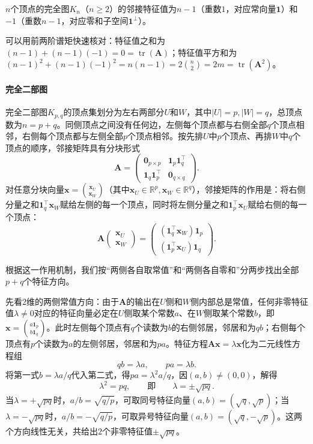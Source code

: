 \begin{theorem}[完全图的邻接谱]
\label{prop:adjacency-complete-spectrum}
$n$个顶点的完全图$K_n$（$n\geq 2$）的邻接特征值为$n-1$（重数$1$，对应常向量$\bm 1$）和$-1$（重数$n-1$，对应零和子空间$\bm 1^\perp$）。
\end{theorem}

可以用前两阶谱矩快速核对：特征值之和为$(n-1)+(n-1)(-1)=0=\operatorname{tr}(\bm A)$；特征值平方和为$(n-1)^2+(n-1)(-1)^2=n(n-1)=2\binom{n}{2}=2m=\operatorname{tr}(\bm A^2)$。

\paragraph{完全二部图}

完全二部图$K_{p,q}$的顶点集划分为左右两部分$U$和$W$，其中$|U|=p,|W|=q$，总顶点数为$n=p+q$。同侧顶点之间没有任何边，左侧每个顶点都与右侧全部$q$个顶点相邻，右侧每个顶点都与左侧全部$p$个顶点相邻。按先排$U$中$p$个顶点、再排$W$中$q$个顶点的顺序，邻接矩阵具有分块形式
\[
\bm A=
\begin{pmatrix}
\bm 0_{p\times p} & \bm 1_p\bm 1_q^\top\\
\bm 1_q\bm 1_p^\top & \bm 0_{q\times q}
\end{pmatrix}.
\]
对任意分块向量$\bm x=\binom{\bm x_U}{\bm x_W}$（其中$\bm x_U\in\mathbb R^p,\bm x_W\in\mathbb R^q$），邻接矩阵的作用是：将右侧分量之和$\bm 1_q^\top\bm x_W$赋给左侧的每一个顶点，同时将左侧分量之和$\bm 1_p^\top\bm x_U$赋给右侧的每一个顶点：
\[
\bm A\begin{pmatrix}\bm x_U\\\bm x_W\end{pmatrix}
=\begin{pmatrix}(\bm 1_q^\top\bm x_W)\bm 1_p\\(\bm 1_p^\top\bm x_U)\bm 1_q\end{pmatrix}.
\]

根据这一作用机制，我们按“两侧各自取常值”和“两侧各自零和”分两步找出全部$p+q$个特征方向。

先看$2$维的两侧常值方向：由于$\bm A$的输出在$U$侧和$W$侧内部总是常值，任何非零特征值$\lambda\neq 0$对应的特征向量必定在$U$侧取某个常数$a$、在$W$侧取某个常数$b$，即$\bm x=\binom{a\bm 1_p}{b\bm 1_q}$。此时左侧每个顶点有$q$个读数为$b$的右侧邻居，邻居和为$qb$；右侧每个顶点有$p$个读数为$a$的左侧邻居，邻居和为$pa$。特征方程$\bm A\bm x=\lambda\bm x$化为二元线性方程组
\[
qb=\lambda a,\qquad pa=\lambda b.
\]
将第一式$b=\lambda a/q$代入第二式，得$pa=\lambda^2 a/q$，因$(a,b)\neq(0,0)$，解得
\[
\lambda^2=pq,\qquad\text{即}\qquad \lambda=\pm\sqrt{pq}.
\]
当$\lambda=+\sqrt{pq}$时，$a/b=\sqrt{q/p}$，可取同号特征向量$(a,b)=(\sqrt{q},\sqrt{p})$；当$\lambda=-\sqrt{pq}$时，$a/b=-\sqrt{q/p}$，可取异号特征向量$(a,b)=(\sqrt{q},-\sqrt{p})$。这两个方向线性无关，共给出$2$个非零特征值$\pm\sqrt{pq}$。

